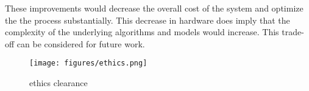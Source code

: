 These improvements would decrease the overall cost of the system and optimize the the process substantially. This decrease in hardware does imply that the complexity of the underlying algorithms and models would increase. This trade-off can be considered for future work.



\newpage
\begin{figure}[!ht] 
\captionsetup{width=1\linewidth, font=small}  
\texttt{[image: figures/ethics.png]}
\caption{ethics clearance}
\label{fig:ethics}
\end{figure}








